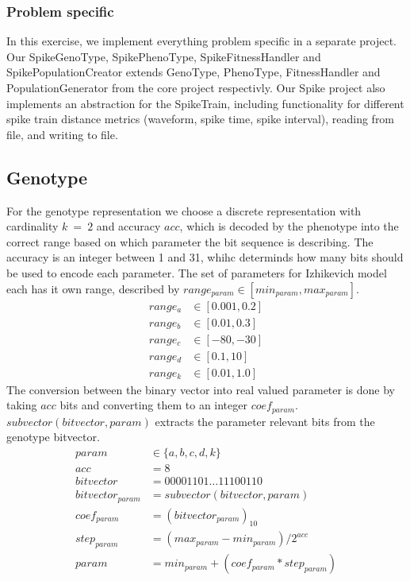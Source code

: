 \documentclass[12pt]{article}
\begin{document}
		\subsubsection{Problem specific}\label{sec:specific}
				In this exercise, we implement everything problem specific in a separate project. Our SpikeGenoType, SpikePhenoType, SpikeFitnessHandler and SpikePopulationCreator extends GenoType, PhenoType, FitnessHandler and PopulationGenerator from the core project respectivly.
		Our Spike project also implements an abstraction for the SpikeTrain, including functionality for different spike train distance metrics (waveform, spike time, spike interval), reading from file, and writing to file.
	\subsection{Genotype}\label{sec:geno}
		For the genotype representation we choose a discrete representation with cardinality $k~=~2$ and accuracy $acc$, which is decoded by the phenotype into the correct range based on which parameter the bit sequence is describing. The accuracy is an integer between 1 and 31, whihc determinds how many bits should be used to encode each parameter. The set of parameters for Izhikevich model each has it own range, described by $range_{param} \in [min_{param}, max_{param}]$. 
		\begin{align}
			range_a &\in [0.001, 0.2]\nonumber\\
			range_b &\in [0.01, 0.3]\nonumber\\
			range_c &\in [-80, -30]\nonumber\\
			range_d &\in [0.1, 10]\nonumber\\
			range_k &\in [0.01, 1.0]\nonumber
		\end{align}
		The conversion between the binary vector into real valued parameter is done by taking $acc$ bits and converting them to an integer $coef_{param}$. $subvector(bitvector, param)$ extracts the parameter relevant bits from the genotype bitvector.
		\begin{align}
			param &\in \{a, b, c, d, k\}\nonumber\\
			acc &= 8\nonumber\\
			bitvector &= 00001101\dots11100110\nonumber\\
			bitvector_{param} &= subvector(bitvector, param)\nonumber\\
			coef_{param} &= (bitvector_{param})_{10}\nonumber\\
			step_{param} &= (max_{param}-min_{param})/2^{acc}\nonumber\\
			param &= min_{param}+(coef_{param}*step_{param})\nonumber
		\end{align}
\end{document}
